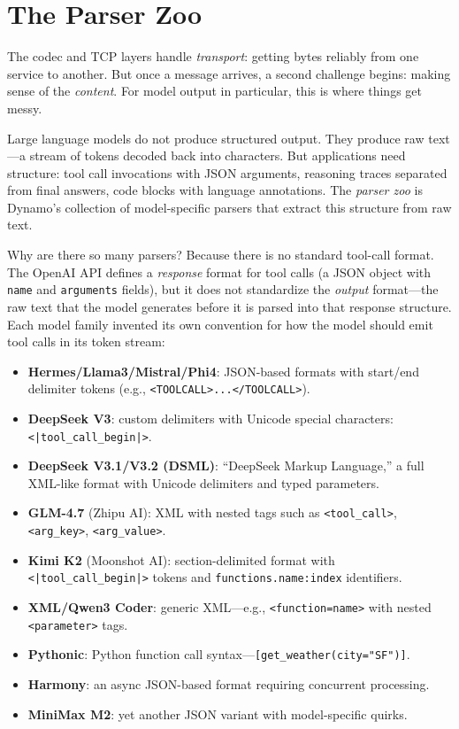 \section{The Parser Zoo}
\label{sec:codecs:parsers}

%
The codec and TCP layers handle \emph{transport}: getting bytes reliably from one service to another. But once a message arrives, a second challenge begins: making sense of the \emph{content}. For model output in particular, this is where things get messy.

Large language models do not produce structured output. They produce raw text---a stream of tokens decoded back into characters. But applications need structure: tool call invocations with JSON arguments, reasoning traces separated from final answers, code blocks with language annotations. The \emph{parser zoo} is Dynamo's collection of model-specific parsers that extract this structure from raw text.

Why are there so many parsers? Because there is no standard tool-call format. The OpenAI API defines a \emph{response} format for tool calls (a JSON object with \texttt{name} and \texttt{arguments} fields), but it does not standardize the \emph{output} format---the raw text that the model generates before it is parsed into that response structure. Each model family invented its own convention for how the model should emit tool calls in its token stream:

\begin{itemize}
  \item \textbf{Hermes/Llama3/Mistral/Phi4}: JSON-based formats with start/end delimiter tokens (e.g., \texttt{<TOOLCALL>...\allowbreak</TOOLCALL>}).
  \item \textbf{DeepSeek V3}: custom delimiters with Unicode special characters: \texttt{<|tool\_call\_begin|>}.
  \item \textbf{DeepSeek V3.1/V3.2 (DSML)}: ``DeepSeek Markup Language,'' a full XML-like format with Unicode delimiters and typed parameters.
  \item \textbf{GLM-4.7} (Zhipu AI): XML with nested tags such as \texttt{<tool\_call>}, \texttt{<arg\_key>}, \texttt{<arg\_value>}.
  \item \textbf{Kimi K2} (Moonshot AI): section-delimited format with \texttt{<|tool\_call\_begin|>} tokens and \texttt{functions.\allowbreak name:index} identifiers.
  \item \textbf{XML/Qwen3 Coder}: generic XML---e.g., \texttt{<function=name>} with nested \texttt{<parameter>} tags.
  \item \textbf{Pythonic}: Python function call syntax---\texttt{[get\_weather(city="SF")]}.
  \item \textbf{Harmony}: an async JSON-based format requiring concurrent processing.
  \item \textbf{MiniMax M2}: yet another JSON variant with model-specific quirks.
\end{itemize}

